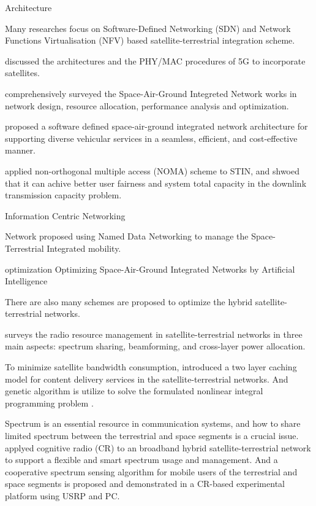 \documentclass[12pt, draftclsnofoot, onecolumn]{IEEEtran}
\begin{document}
Architecture

Many researches focus on Software-Defined Networking (SDN) and Network Functions
Virtualisation (NFV) based satellite-terrestrial integration scheme. 

\cite{guidotti2019architectures} discussed the architectures and the PHY/MAC procedures of 5G to incorporate satellites.


\cite{sagin} comprehensively surveyed the Space-Air-Ground Integreted Network works in network design, resource allocation, performance analysis and optimization.

\cite{zhang2017software} proposed a software defined space-air-ground integrated network architecture for supporting diverse vehicular services in a seamless, efficient, and cost-effective manner.

\cite{zhu2017non} applied non-orthogonal multiple access (NOMA) scheme to STIN, and shwoed that it can achive better user fairness and system total capacity in the downlink transmission capacity problem.

Information Centric Networking \cite{chen2020exploitation}\cite{li2019icn}



Network
\cite{liu2018space} proposed using Named Data Networking to manage the Space-Terrestrial Integrated mobility.



optimization
\cite{kato2019optimizing} Optimizing Space-Air-Ground Integrated Networks by Artificial Intelligence

There are also many schemes are proposed to optimize the hybrid satellite-terrestrial networks.


\cite{kuang2017radio} surveys the radio resource management in satellite-terrestrial networks in three main aspects: spectrum sharing, beamforming, and cross-layer power allocation.



To minimize satellite bandwidth consumption, \cite{wu2016two} introduced a two layer caching model for content delivery services in the satellite-terrestrial networks. And genetic algorithm is utilize to solve the formulated nonlinear integral programming problem .

Spectrum is an essential resource in communication systems, and how to share limited spectrum between the terrestrial and space segments is a crucial issue. \cite{jia2016broadband} applyed cognitive radio (CR) to an broadband hybrid satellite-terrestrial network to support a flexible and smart spectrum usage and management. And a cooperative spectrum sensing algorithm for mobile users of the terrestrial and space segments is proposed and demonstrated in a CR-based experimental platform using USRP and PC.
\end{document}
